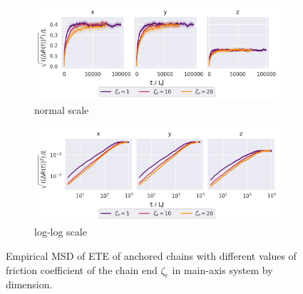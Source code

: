 \documentclass[
    paper=A4,pagesize=automedia,fontsize=12pt,
    BCOR=15mm,DIV=22,
    twoside,headinclude,footinclude=false,
    fleqn,             %
    bibliography=totocnumbered,          %
    listof=totoc,                %
    listof=flat,                 %
    cleardoublepage=empty      %
    numbers=endperiod
]{scrartcl}
\begin{document}
\begin{figure}
    \centering
    \begin{subfigure}[b]{\textwidth}
        \centering
        \includegraphics[width=\textwidth]{14+15+16-exp-msd-dim.png}
        \caption{normal scale}
        \label{fig:msd_anchored_zeta-dim-normal}
    \end{subfigure}
    \begin{subfigure}[b]{\textwidth}
        \centering
        \includegraphics[width=\textwidth]{14+15+16-exp-msd-dim-log.png}
        \caption{log-log scale}
        \label{fig:msd_anchored_zeta-dim-log}
    \end{subfigure}
    \caption{
        Empirical MSD of ETE of anchored chains with different values of
        friction coefficient of the chain end $\zeta_e$ in main-axis system
        by dimension.
    }
    \label{fig:msd_anchored_zeta-dim}
\end{figure}

\FloatBarrier
\end{document}
